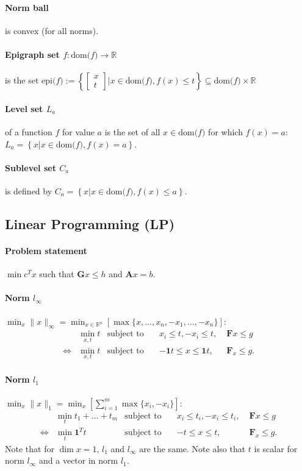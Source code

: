 \documentclass[landscape,a4paper,8pt]{scrartcl}
\newcommand{\R}{\mathbb R}
\newcommand\vA{\bm{A}}
\newcommand\vF{\bm{F}}
\newcommand\vG{\bm{G}}
\newcommand{\Me}[1]{\begin{bmatrix}#1\end{bmatrix}} %
\begin{document}
\begin{multicols*}{3}
\paragraph{Norm ball} is convex (for all norms).
\paragraph{Epigraph set $f : \text{dom($f$)} \rightarrow \R$} is the set $\text{epi($f$)} :=
\left\{ \Me{x\\t} | x \in \text{dom($f$)}, f(x) \le t \right\} \subseteq \text{dom($f$)} \times \R$
\paragraph{Level set $L_a$} of a function $f$ for value $a$ is the set of all $x \in \text{dom($f$)}$ for which $f(x) = a$: $L_a = \left\{x | x \in \text{dom($f$)}, f(x) = a\right\}$.
\paragraph{Sublevel set $C_a$} is defined by $C_a = \left\{x | x \in \text{dom($f$)}, f(x) \le a\right\}$.


\subsection{Linear Programming (LP)}
\paragraph{Problem statement} $\min c^Tx$ such that $\vG x \leq h$ and $\vA x = b$.
\paragraph{Norm $l_\infty$}
$\min_x \lVert x \rVert_\infty = \min_{x \in \R^n} \left[ \max\{x,\dots,x_n,-x_1,\dots,-x_n\}\right]$:
\begin{align*}
     & \min_{x,t} t & \text{subject to}\quad & x_i \leq t, -x_i \leq t,   \; & \vF x \leq g \\
\iff & \min_{x,t} t & \text{subject to}\quad & -{\bm 1} t \leq x \leq {\bm 1} t,\; & \vF_x \leq g.
\end{align*}

\paragraph{Norm $l_1$}
$\min_x \lVert x \rVert_1 = \min_x\left[\sum_{i=1}^{m} \max\{x_i,-x_i\}\right]$:
\begin{align*}
     & \min_{t} t_1 + \dots + t_m & \text{subject to}\quad & x_i \leq t_i, -x_i \leq t_i,\; & \vF x \leq g \\
\iff & \min_{t} {\bm 1}^Tt    & \text{subject to}\quad & -t \leq x \leq t,\;            & \vF_x \leq g.
\end{align*}
Note that for $\dim x = 1$, $l_1$ and $l_\infty$ are the same.
Note also that $t$ is scalar for norm $l_\infty$ and a vector in norm $l_1$.


\end{multicols*}
\end{document}
